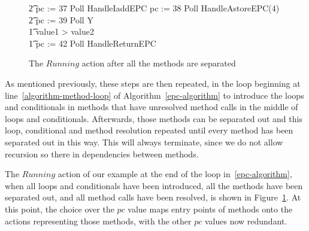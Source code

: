 \begin{figure}[p!]
\begin{circus}
    \t2 pc := 37 \circseq Poll \circseq HandleIaddEPC \circseq pc := 38 \circseq Poll \circseq HandleAstoreEPC(4) \circseq \\
    \t2 pc := 39 \circseq Poll \circseq Y \\
    \t1 {} \circelse value1 > value2 \circthen \Skip \\
    \t1 \circfi \circseq pc := 42 \circseq Poll \circseq HandleReturnEPC
  \end{circus}
  \caption{The $Running$ action after all the methods are separated}
  \label{final-method-separation-example-figure}
\end{figure}

As mentioned previously, these steps are then repeated, in the loop
beginning at line~\ref{algorithm-method-loop} of
Algorithm~\ref{epc-algorithm} to introduce the loops and conditionals
in methods that have unresolved method calls in the middle of loops
and conditionals.
Afterwards, those methods can be separated out and this loop,
conditional and method resolution repeated until every method has been
separated out in this way.
This will always terminate, since we do not allow recursion so there
in dependencies between methods.

The $Running$ action of our example at the end of the loop
in~\ref{epc-algorithm}, when all loops and conditionals have been
introduced, all the methods have been separated out, and all method
calls have been resolved, is shown in
Figure~\ref{final-method-separation-example-figure}.
At this point, the choice over the $pc$ value maps entry points of
methods onto the actions representing those methods, with the other
$pc$ values now redundant.

